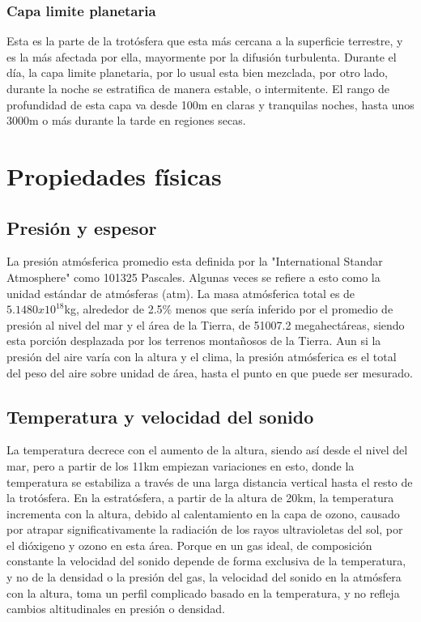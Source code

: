\documentclass{article}
\begin{document}
\subsubsection {Capa limite planetaria}
Esta es la parte de la trotósfera que esta más cercana a la superficie terrestre, y es la más afectada por ella, mayormente por la difusión turbulenta. Durante el día, la capa limite planetaria, por lo usual esta bien mezclada, por otro lado, durante la noche se estratifica de manera estable, o intermitente.
El rango de profundidad de esta capa va desde 100m en claras y tranquilas noches, hasta unos 3000m o más durante la tarde en regiones secas.

\section {Propiedades físicas}
\subsection {Presión y espesor}
La presión atmósferica promedio esta definida por la "International Standar Atmosphere" como 101325 Pascales. Algunas veces se refiere a esto como la unidad estándar de atmósferas (atm). La masa atmósferica total es de $5.1480x10^18$kg, alrededor de 2.5\% menos que sería inferido por el promedio de presión al nivel del mar y el área de la Tierra, de 51007.2 megahectáreas, siendo esta porción desplazada por los terrenos montañosos de la Tierra.
Aun si la presión del aire varía con la altura y el clima, la presión atmósferica es el total del peso del aire sobre unidad de área, hasta el punto en que puede ser mesurado.

\subsection {Temperatura y velocidad del sonido}
La temperatura decrece con el aumento de la altura, siendo así desde el nivel del mar, pero a partir de los 11km empiezan variaciones en esto, donde la temperatura se estabiliza a través de una larga distancia vertical hasta el resto de la trotósfera.
En la estratósfera, a partir de la altura de 20km, la temperatura incrementa con la altura, debido al calentamiento en la capa de ozono, causado por atrapar significativamente la radiación de los rayos ultravioletas del sol, por el dióxigeno y ozono en esta área.
Porque en un gas ideal, de composición constante la velocidad del sonido depende de forma exclusiva de la temperatura, y no de la densidad o la presión del gas, la velocidad del sonido en la atmósfera con la altura, toma un perfil complicado basado en la temperatura, y no refleja cambios altitudinales en presión o densidad.
\end{document}

